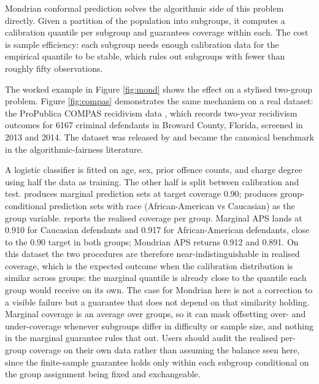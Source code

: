 Mondrian conformal prediction solves the algorithmic side of this problem
directly. Given a partition of the population into subgroups, it computes a
calibration quantile per subgroup and guarantees coverage within each. The
cost is sample efficiency: each subgroup needs enough calibration data for
the empirical quantile to be stable, which rules out subgroups with fewer
than roughly fifty observations.

The worked example in Figure \ref{fig:mond} shows the effect on a
stylised two-group problem. Figure \ref{fig:compas} demonstrates
the same mechanism on a real dataset: the ProPublica COMPAS
recidivism data \citep{angwin2016machine}, which records two-year
recidivism outcomes for 6167 criminal defendants in Broward
County, Florida, screened in 2013 and 2014. The dataset was
released by \citet{angwin2016machine} and became the canonical benchmark
in the algorithmic-fairness literature.

A logistic classifier is fitted on age, sex, prior offence counts,
and charge degree using half the data as training. The other half
is split between calibration and test.
 produces marginal prediction sets at target
coverage 0.90;  produces
group-conditional prediction sets with race (African-American vs
Caucasian) as the group variable.
 reports the realised coverage per
group. Marginal APS lands at 0.910 for Caucasian defendants and
0.917 for African-American defendants, close to the 0.90 target in
both groups; Mondrian APS returns 0.912 and 0.891. On this dataset
the two procedures are therefore near-indistinguishable in realised
coverage, which is the expected outcome when the calibration
distribution is similar across groups: the marginal quantile is
already close to the quantile each group would receive on its own.
The case for Mondrian here is not a correction to a visible failure
but a guarantee that does not depend on that similarity holding.
Marginal coverage is an average over groups, so it can mask
offsetting over- and under-coverage whenever subgroups differ in
difficulty or sample size, and nothing in the marginal guarantee
rules that out. Users should audit the realised per-group coverage
on their own data rather than assuming the balance seen here, since
the finite-sample guarantee holds only within each subgroup
conditional on the group assignment being fixed and exchangeable.

